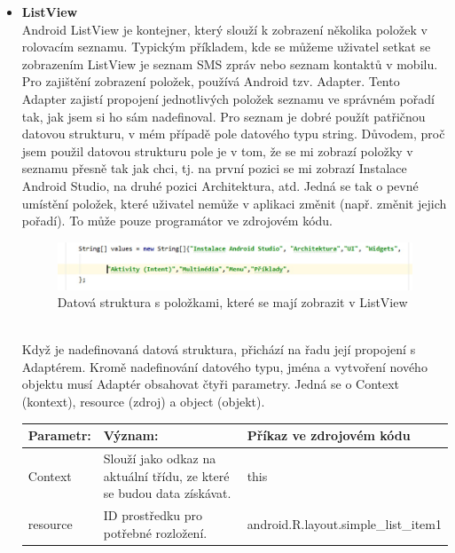 \documentclass{vskpou} %
\begin{document}
\begin{itemize}
    \item \textbf{ListView}\\
    Android ListView je kontejner, který slouží k zobrazení několika položek v rolovacím seznamu. Typickým příkladem, kde se můžeme uživatel setkat se zobrazením ListView je seznam SMS zpráv nebo seznam kontaktů v mobilu. Pro zajištění zobrazení položek, používá Android tzv. Adapter. Tento Adapter zajistí propojení jednotlivých položek seznamu ve správném pořadí tak, jak jsem si ho sám nadefinoval. Pro seznam je dobré použít patřičnou datovou strukturu, v mém případě pole datového typu string. Důvodem, proč jsem použil datovou strukturu pole je v tom, že se mi zobrazí položky v seznamu přesně tak jak chci, tj. na první pozici se mi zobrazí Instalace Android Studio, na druhé pozici Architektura, atd. Jedná se tak o pevné umístění položek, které uživatel nemůže v aplikaci změnit (např. změnit jejich pořadí). To může pouze programátor ve zdrojovém kódu.
        \begin{figure}[h!]
        \centering
        \includegraphics[scale=0.5]{images/20.jpg}
        \caption{Datová struktura s položkami, které se mají zobrazit v ListView}
        \label{20}
        \end{figure}
        \\
        Když je nadefinovaná datová struktura, přichází na řadu její propojení s Adaptérem. Kromě nadefinování datového typu, jména a vytvoření nového objektu musí Adaptér obsahovat čtyři parametry. Jedná se o Context (kontext), resource (zdroj) a object (objekt).\\
        
        
        
            \begin{table}[h]
            \begin{center}
            \begin{tabular}{ |p{3cm}|p{3cm}|p{6cm}| }
            
            
            
            \hline
            {\centering}\textbf{Parametr:}&
             {\centering}\textbf{Význam:}&
             {\centering}\textbf{Příkaz ve zdrojovém kódu}
             \\
            \hline
           Context&
            Slouží jako odkaz na aktuální třídu, ze které se budou data získávat.&
            this
             \\
            \hline
           resource&
            ID prostředku pro potřebné rozložení.&
            android.R.layout.simple\_list\_item1
            

\end{tabular}
\end{center}
\end{table}
\end{itemize}
\end{document}
